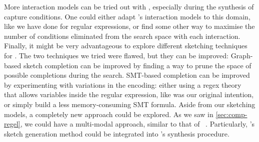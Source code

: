 More interaction models can be tried out with \Forest, especially during the synthesis of capture conditions. One could either adapt \citeauthor{UnchartIt20}'s interaction models to this domain, like we have done for regular expressions, or find some other way to maximise the number of conditions eliminated from the search space with each interaction.
%
Finally, it might be very advantageous to explore different sketching techniques for \Forest. The two techniques we tried were flawed, but they can be improved: Graph-based sketch completion can be improved by finding a way to prune the space of possible completions during the search. SMT-based completion can be improved by experimenting with variations in the encoding: either using a regex theory that allows variables inside the regular expression, like was our original intention, or simply build a less memory-consuming SMT formula. Aside from our sketching models, a completely new approach could be explored. As we saw in \autoref{sec:comp-regel}, we could have a multi-modal approach, similar to that of \Regel{}~\cite{Regel20}. Particularly, \Regel's sketch generation method could be integrated into \Forest's synthesis procedure.